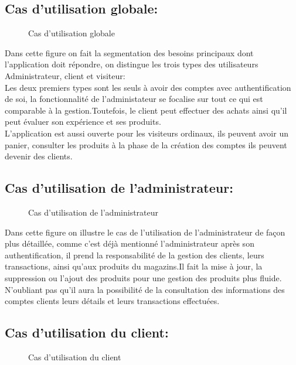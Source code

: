 \documentclass[a4paper]{report}
\begin{document}
\begin{doublespace}
	\subsection{Cas d'utilisation globale:}
	\begin{figure}[H]
		\begin{center}
			\caption{Cas d'utilisation globale}
		\end{center}
	\end{figure}
	\newpage
	Dans cette figure on fait la segmentation des besoins
	principaux dont l'application doit répondre, on distingue les trois types des
	utilisateurs Administrateur, client et visiteur: \\Les deux premiers types sont
	les seuls à avoir des comptes avec authentification de soi, la fonctionnalité
	de l'administateur se focalise sur tout ce qui est comparable à la
	gestion.Toutefois, le client peut effectuer des achats ainsi qu'il peut évaluer
	son expérience et ses produits. \\ L'application est aussi ouverte pour les
	visiteurs ordinaux, ils peuvent avoir un panier, consulter les produits à la
	phase de la création des comptes ils peuvent devenir des clients.
	
	\subsection{Cas d'utilisation de l'administrateur:}
	\begin{figure}[H]
		\begin{center}
			\caption{Cas d'utilisation de l'administrateur}
		\end{center}
	\end{figure}
	Dans cette figure on illustre le cas de l'utilisation de
	l'administrateur de façon plus détaillée, comme c'est déjà mentionné
	l'administrateur après son authentification, il prend la responsabilité de la
	gestion des clients, leurs transactions, ainsi qu'aux produits du magazins.Il
	fait la mise à jour, la suppression ou l'ajout des produits pour une gestion
	des produits plus fluide.\\ N'oubliant pas qu'il aura la possibilité de la
	consultation des informations des comptes clients leurs détails et leurs
	transactions effectuées.
	
	\subsection{Cas d'utilisation du client:}
	\begin{figure}[H]
		\begin{center}
			\caption{Cas d'utilisation du client}
		\end{center}
	\end{figure}
	

\end{doublespace}
\end{document}
